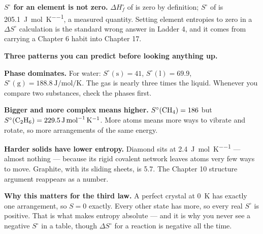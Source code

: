 \documentclass{apchem-worksheet}
\begin{document}
\begin{apctrap}
\textbf{$S^{\circ}$ for an element is not zero.} $\Delta H_{f}^{\circ}$
of  is zero by definition; $S^{\circ}$ of  is
\SI{205.1}{\joule\per\mole\per\kelvin}, a measured quantity. Setting
element entropies to zero in a $\Delta S^{\circ}$ calculation is the
standard wrong answer in Ladder 4, and it comes from carrying a
Chapter 6 habit into Chapter 17.
\end{apctrap}

\begin{workedexample}
\textbf{Three patterns you can predict before looking anything up.}

\textbf{Phase dominates.} For water: $S^{\circ}(\text{s}) = 41$,
$S^{\circ}(\text{l}) = 69.9$, $S^{\circ}(\text{g}) =
\SI{188.8}{\joule\per\mole\per\kelvin}$. The gas is nearly three times
the liquid. Whenever you compare two substances, check the phases
first.

\textbf{Bigger and more complex means higher.} $S^{\circ}(\ce{CH4}) =
186$ but $S^{\circ}(\ce{C2H6}) =
\SI{229.5}{\joule\per\mole\per\kelvin}$. More atoms means more ways to
vibrate and rotate, so more arrangements of the same energy.

\textbf{Harder solids have lower entropy.} Diamond sits at
\SI{2.4}{\joule\per\mole\per\kelvin} --- almost nothing --- because its
rigid covalent network leaves atoms very few ways to move. Graphite,
with its sliding sheets, is \SI{5.7}{}. The Chapter 10 structure
argument reappears as a number.

\textbf{Why this matters for the third law.} A perfect crystal at
\SI{0}{\kelvin} has exactly one arrangement, so $S = 0$ exactly. Every
other state has more, so every real $S^{\circ}$ is positive. That is
what makes entropy absolute --- and it is why you never see a negative
$S^{\circ}$ in a table, though $\Delta S^{\circ}$ for a reaction is
negative all the time.
\end{workedexample}
\end{document}
